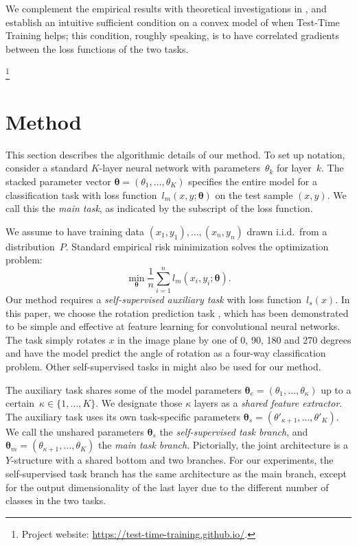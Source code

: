 \documentclass{article}
\theoremstyle{plain}
\theoremstyle{remark}
\theoremstyle{definition}
\def\vtheta{{\bm{\theta}}}
\begin{document}
We complement the empirical results with theoretical investigations in , and establish an intuitive sufficient condition on a convex model of when Test-Time Training helps; this condition, roughly speaking, is to have correlated gradients between the loss functions of the two tasks.
\newcommand\blfootnote[1]{
  \begingroup
  \renewcommand\thefootnote{}\footnote{#1}
  \addtocounter{footnote}{-1}
  \endgroup
}
\blfootnote{Project website: {\scriptsize \url{https://test-time-training.github.io/}}.}
\newpage

\section{Method}
\label{method}
This section describes the algorithmic details of our method.
To set up notation, consider a standard $K$-layer neural network with parameters~$\theta_k$ for layer~$k$. The stacked parameter vector $\vtheta=(\theta_1,\dots,\theta_K)$ specifies the entire model for a classification task with loss function~$l_m(x, y; \vtheta)$ on the test sample $(x,y)$. We call this the \emph{main task}, as indicated by the subscript of the loss function. 

We assume to have training data $(x_1,y_1),\dots,(x_n, y_n)$ drawn i.i.d.~from a distribution~$P$. Standard empirical risk minimization solves the optimization problem:
\begin{equation} \label{optimize}
\min_\vtheta \frac{1}{n}\sum_{i=1}^{n} l_m(x_i, y_i; \vtheta).
\end{equation}
Our method requires a \emph{self-supervised auxiliary task} with loss function~$l_s(x)$. 
In this paper, we choose the rotation prediction task \citep{gidaris2018unsupervised}, which has been demonstrated to be simple and effective at feature learning for convolutional neural networks.
The task simply rotates $x$ in the image plane by one of 0, 90, 180 and 270 degrees and have the model predict the angle of rotation as a four-way classification problem. 
Other self-supervised tasks in  might also be used for our method.

The auxiliary task shares some of the model parameters
$\vtheta_e=(\theta_1,\dots,\theta_\kappa)$ up to a
certain~$\kappa\in\{1,\dots,K\}.$
We designate those $\kappa$ layers as a
\emph{shared feature extractor}. 
The auxiliary task uses its own task-specific parameters 
$\vtheta_s = (\theta'_{\kappa+1},\dots, \theta'_{K})$. 
We call the unshared parameters $\vtheta_s$ the \emph{self-supervised task branch}, and $\vtheta_m=(\theta_{\kappa+1},\dots,\theta_K)$ the
\emph{main task branch}.
Pictorially, the joint architecture is a $Y$-structure with a shared bottom and two branches.
For our experiments, the self-supervised task branch has the same architecture as the main branch, except for the output dimensionality of the last layer due to the different number of classes in the two tasks.
\end{document}
